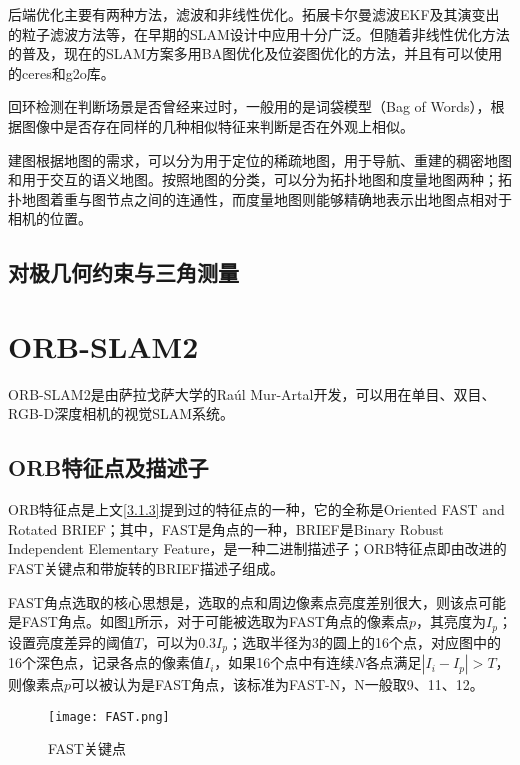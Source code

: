 后端优化主要有两种方法，滤波和非线性优化。拓展卡尔曼滤波EKF及其演变出的粒子滤波方法等，在早期的SLAM设计中应用十分广泛。但随着非线性优化方法的普及，现在的SLAM方案多用BA图优化及位姿图优化的方法，并且有可以使用的ceres和g2o库。

回环检测在判断场景是否曾经来过时，一般用的是词袋模型（Bag of Words），根据图像中是否存在同样的几种相似特征来判断是否在外观上相似。

建图根据地图的需求，可以分为用于定位的稀疏地图，用于导航、重建的稠密地图和用于交互的语义地图。按照地图的分类，可以分为拓扑地图和度量地图两种；拓扑地图着重与图节点之间的连通性，而度量地图则能够精确地表示出地图点相对于相机的位置。


\subsection{对极几何约束与三角测量} \label{3.1.4}


\section{ORB-SLAM2}

ORB-SLAM2是由萨拉戈萨大学的Raúl Mur-Artal开发，可以用在单目、双目、RGB-D深度相机的视觉SLAM系统。

\subsection{ORB特征点及描述子} \label{3.2.1}

ORB特征点是上文\ref{3.1.3}提到过的特征点的一种，它的全称是Oriented FAST and Rotated BRIEF；其中，FAST是角点的一种，BRIEF是Binary Robust Independent Elementary Feature，是一种二进制描述子；ORB特征点即由改进的FAST关键点和带旋转的BRIEF描述子组成。

FAST角点选取的核心思想是，选取的点和周边像素点亮度差别很大，则该点可能是FAST角点。如图\ref{fig7}所示，对于可能被选取为FAST角点的像素点$p$，其亮度为$I_p$；设置亮度差异的阈值$T$，可以为$0.3I_p$；选取半径为3的圆上的16个点，对应图中的16个深色点，记录各点的像素值$I_i$，如果16个点中有连续$N$各点满足$|I_i-I_p|>T$，则像素点$p$可以被认为是FAST角点，该标准为FAST-N，N一般取9、11、12。




\begin{figure}[!ht]
	\centering
	\texttt{[image: FAST.png]}
	\caption{FAST关键点} 
	\label{fig7}
\end{figure}

